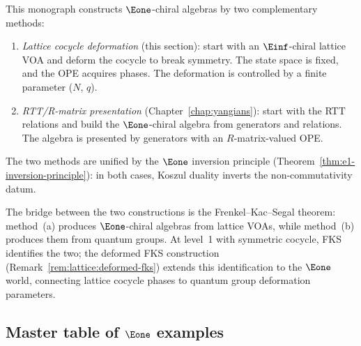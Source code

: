 \begin{remark}
\label{rem:two-e1-methods}
This monograph constructs $\Eone$-chiral algebras by two
complementary methods:
\begin{enumerate}[label=\textup{(\alph*)}]
\item \emph{Lattice cocycle deformation}
 (this section): start with an $\Einf$-chiral lattice VOA and
 deform the cocycle to break symmetry. The state space is fixed,
 and the OPE acquires phases.
 The deformation is controlled by a finite parameter ($N$, $q$).
\item \emph{RTT/R-matrix presentation}
 (Chapter~\ref{chap:yangians}): start with the RTT relations and
 build the $\Eone$-chiral algebra from generators and relations.
 The algebra is presented by generators with an
 $R$-matrix-valued OPE.
\end{enumerate}
The two methods are unified by the $\Eone$ inversion principle
(Theorem~\ref{thm:e1-inversion-principle}): in both cases, Koszul
duality inverts the non-commutativity datum.

The bridge between the two constructions is the Frenkel--Kac--Segal
theorem: method~(a) produces $\Eone$-chiral algebras from lattice
VOAs, while method~(b) produces them from quantum groups. At level~1 with
symmetric cocycle, FKS identifies the two; the deformed FKS
construction (Remark~\ref{rem:lattice:deformed-fks}) extends this
identification to the $\Eone$ world, connecting lattice cocycle
phases to quantum group deformation parameters.
\end{remark}


\subsection{Master table of $\Eone$ examples}

